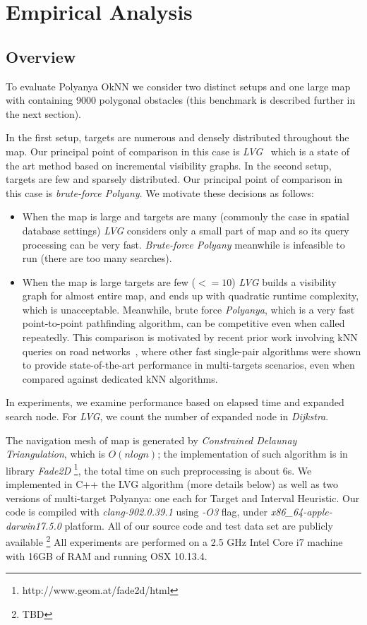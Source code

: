 \chapter{Empirical Analysis}\label{empirical}
\section{Overview}\label{expoverview}
To evaluate Polyanya OkNN we consider two distinct setups and one large map with 
containing 9000 polygonal obstacles (this benchmark is described further in the next section).

In the first setup, targets are numerous and densely distributed throughout
the map. Our principal point of comparison in this case is \textit{LVG}~\cite{zhang2004spatial} which
is a state of the art method based on incremental visibility graphs. 
In the second setup, targets are few and sparsely distributed.
Our principal point of comparison in this case is \textit{brute-force Polyany}.
We motivate these decisions as follows:

\begin{itemize}[leftmargin=1cm]
\item When the map is large and targets are many (commonly the case in spatial database settings) \textit{LVG} considers only a small part of map and so its query processing can be very fast.
  \textit{Brute-force Polyany} meanwhile is infeasible to run (there are too many searches).

\item When the map is large targets are few ($<=10$) \textit{LVG} builds a visibility graph for almost entire map,
  and ends up with quadratic runtime complexity, which is unacceptable.
    Meanwhile, brute force \textit{Polyanya}, which is a very fast point-to-point pathfinding algorithm,
    can be competitive even when called repeatedly.
    This comparison is motivated by recent prior work involving kNN queries on road networks~\cite{abeywickrama2016k},
    where other fast single-pair algorithms were shown to provide state-of-the-art performance in multi-targets scenarios,
    even when compared against dedicated kNN algorithms.
\end{itemize}

In experiments, we examine performance based on elapsed time and expanded search node.
For \textit{LVG}, we count the number of expanded node in \textit{Dijkstra}.

The navigation mesh of map is generated by \textit{Constrained Delaunay Triangulation}, which is $O(nlogn)$;
the implementation of such algorithm is in library \textit{Fade2D} \footnote{http://www.geom.at/fade2d/html},
the total time on such preprocessing is about 6s.
We implemented in C++ the LVG algorithm (more details below) as well as two versions of multi-target Polyanya:
one each for Target and Interval Heuristic.
Our code is compiled with \textit{clang-902.0.39.1} using \textit{-O3} flag,
under \textit{x86\_64-apple-darwin17.5.0} platform.
All of our source code and test data set are  publicly available \footnote{TBD}
All experiments are performed on a 2.5 GHz Intel Core i7 machine with 16GB of RAM and running OSX 10.13.4. 


